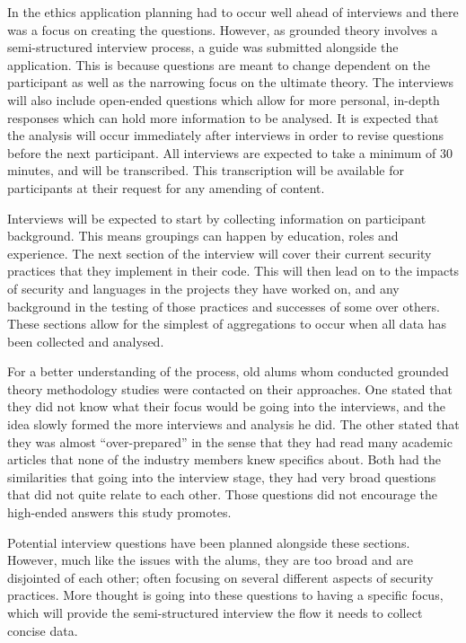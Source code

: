 \par In the ethics application planning had to occur well ahead of interviews and there was a focus on creating the questions. However, as grounded theory involves a semi-structured interview process, a guide was submitted alongside the application. This is because questions are meant to change dependent on the participant as well as the narrowing focus on the ultimate theory. The interviews will also include open-ended questions which allow for more personal, in-depth responses which can hold more information to be analysed. It is expected that the analysis will occur immediately after interviews in order to revise questions before the next participant.  All interviews are expected to take a minimum of 30 minutes, and will be transcribed. This transcription will be available for participants at their request for any amending of content.
\newline
\par Interviews will be expected to start by collecting information on participant background. This means groupings can happen by education, roles and experience. The next section of the interview will cover their current security practices that they implement in their code. This will then lead on to the impacts of security and languages in the projects they have worked on, and any background in the testing of those practices and successes of some over others. These sections allow for the simplest of aggregations to occur when all data has been collected and analysed. 
\newline
\par For a better understanding of the process, old alums whom conducted grounded theory methodology studies were contacted on their approaches. One stated that they did not know what their focus would be going into the interviews, and the idea slowly formed the more interviews and analysis he did. The other stated that they was almost “over-prepared” in the sense that they had read many academic articles that none of the industry members knew specifics about. Both had the similarities that going into the interview stage, they had very broad questions that did not quite relate to each other. Those questions did not encourage the high-ended answers this study promotes. 
\newline
\par Potential interview questions have been planned alongside these sections. However, much like the issues with the alums, they are too broad and are disjointed of each other; often focusing on several different aspects of security practices. More thought is going into these questions to having a specific focus, which will provide the semi-structured interview the flow it needs to collect concise data.


